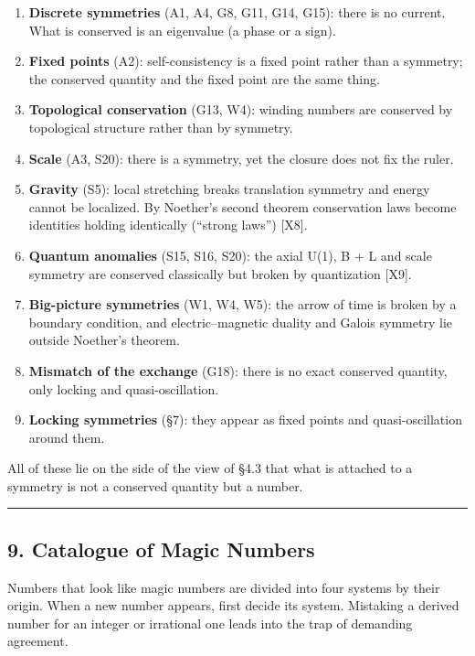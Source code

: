 \documentclass[
  a4paper,
]{article}
\providecommand{\tightlist}{%
  \setlength{\itemsep}{0pt}\setlength{\parskip}{0pt}}
\begin{document}
\begin{enumerate}
\def\labelenumi{\arabic{enumi}.}
\tightlist
\item
  \textbf{Discrete symmetries} (A1, A4, G8, G11, G14, G15): there is no
  current. What is conserved is an eigenvalue (a phase or a sign).
\item
  \textbf{Fixed points} (A2): self-consistency is a fixed point rather
  than a symmetry; the conserved quantity and the fixed point are the
  same thing.
\item
  \textbf{Topological conservation} (G13, W4): winding numbers are
  conserved by topological structure rather than by symmetry.
\item
  \textbf{Scale} (A3, S20): there is a symmetry, yet the closure does
  not fix the ruler.
\item
  \textbf{Gravity} (S5): local stretching breaks translation symmetry
  and energy cannot be localized. By Noether's second theorem
  conservation laws become identities holding identically (``strong
  laws'') {[}X8{]}.
\item
  \textbf{Quantum anomalies} (S15, S16, S20): the axial U(1), B + L and
  scale symmetry are conserved classically but broken by quantization
  {[}X9{]}.
\item
  \textbf{Big-picture symmetries} (W1, W4, W5): the arrow of time is
  broken by a boundary condition, and electric--magnetic duality and
  Galois symmetry lie outside Noether's theorem.
\item
  \textbf{Mismatch of the exchange} (G18): there is no exact conserved
  quantity, only locking and quasi-oscillation.
\item
  \textbf{Locking symmetries} (§7): they appear as fixed points and
  quasi-oscillation around them.
\end{enumerate}

All of these lie on the side of the view of §4.3 that what is attached
to a symmetry is not a conserved quantity but a number.

\begin{center}\rule{0.5\linewidth}{0.5pt}\end{center}

\subsection{9. Catalogue of Magic
Numbers}\label{catalogue-of-magic-numbers}

Numbers that look like magic numbers are divided into four systems by
their origin. When a new number appears, first decide its system.
Mistaking a derived number for an integer or irrational one leads into
the trap of demanding agreement.
\end{document}
